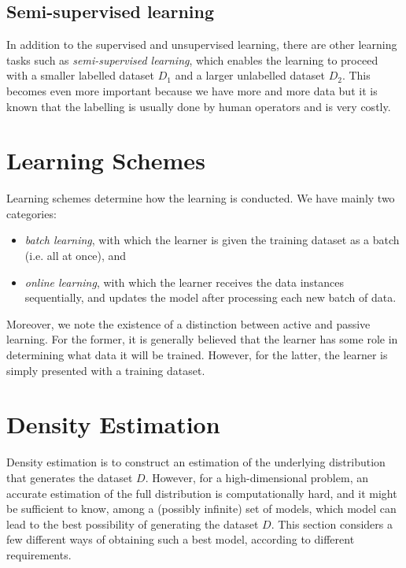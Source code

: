 \subsection*{Semi-supervised learning}

In addition to the supervised and unsupervised learning, there are other learning tasks such as  \emph{semi-supervised learning}, which enables the learning to proceed with a smaller labelled dataset $D_1$ and a larger unlabelled dataset $D_2$. This becomes even more important because we have more and more data but it is known that the labelling is usually done by human operators and is very costly. 

\section{Learning Schemes}\label{sec:learningschemes}

Learning schemes determine how the learning is conducted. We have mainly two categories: 
\begin{itemize}
    \item \emph{batch learning}, with which the learner is given the training dataset as a batch (i.e. all at once), and 
    \item \emph{online learning}, with which the learner receives the data instances sequentially, and updates the model after processing each new batch of data.
\end{itemize}



Moreover, we note the existence of a distinction between active and passive learning. For the former, it is generally believed that the learner has some role in determining what data it will be trained. However, for the latter, the learner is simply presented with a training dataset. 

\section{Density Estimation}

Density estimation is to construct an estimation of the underlying distribution that generates the dataset $D$. However, for a high-dimensional problem, an accurate estimation of the full distribution is computationally hard, and it might be sufficient to know, among a (possibly infinite) set of models, which model can lead to the best possibility of generating the dataset $D$. This section considers a few different ways of obtaining such a best model, according to different requirements. 

